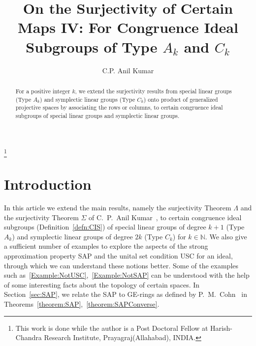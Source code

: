 \documentclass[12pt]{amsart}
\newcommand{\Gl}{\Lambda}
\newcommand{\Gs}{\Sigma}
\newcommand{\mbb}{\mathbb}
\newcommand{\N}{\mbb N}
\theoremstyle{plain}
\theoremstyle{definition}
\theoremstyle{remark}
\numberwithin{equation}{section}
\begin{document}
\title[On the Surjectivity of Certain Maps IV: For Congruence Ideal Subgroups]{On the Surjectivity of Certain Maps IV: For Congruence Ideal Subgroups of Type $A_k$ and $C_k$}
\author[C.P. Anil Kumar]{C.P. Anil Kumar}
\address{Post Doctoral Fellow in Mathematics, Room. No. 223, Middle Floor, Main Building, Harish-Chandra Research Institute, Chhatnag Road, Jhunsi, Prayagraj (Allahabad)-211019, Uttar Pradesh, INDIA}
\thanks{This work is done while the author is a Post Doctoral Fellow at Harish-Chandra Research Institute, Prayagraj(Allahabad), INDIA.}
\begin{abstract}
For a positive integer $k$, we extend the surjectivity results from special linear groups (Type $A_k$) and symplectic linear groups (Type $C_k$) onto product of generalized projective spaces by associating the rows or columns, to certain congruence ideal subgroups of special linear groups and symplectic linear groups. 
\end{abstract}
\maketitle

\section{\bf{Introduction}}
In this article we extend the main results, namely the surjectivity Theorem $\Gl$ and the surjectivity Theorem $\Gs$ of C.~P.~Anil Kumar~\cite{CPAKII}, to certain congruence ideal subgroups (Definition~\ref{defn:CIS}) of special linear groups of degree $k+1$ (Type $A_k$) and symplectic linear groups of degree $2k$ (Type $C_k$) for $k\in \N$. We also give a sufficient number of examples to explore the aspects of the strong approximation property SAP and the unital set condition USC for an ideal, through which we can understand these notions better. Some of the examples such as~\ref{Example:NotUSC},~\ref{Example:NotSAP} can be understood with the help of some interesting facts about the topology of certain spaces. In Section~\ref{sec:SAP}, we relate the SAP to GE-rings as defined by P.~M.~Cohn~\cite{MR0207856} in Theorems~\ref{theorem:SAP},~\ref{theorem:SAPConverse}. 
\end{document}
